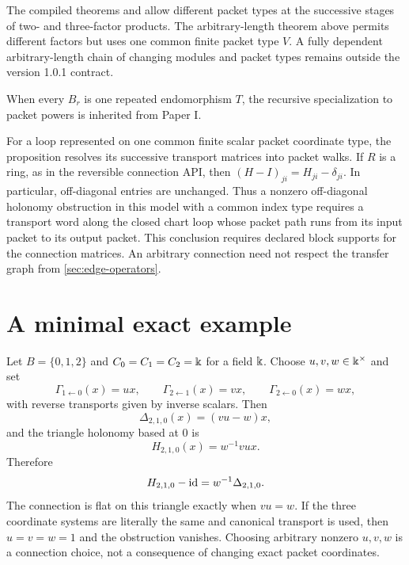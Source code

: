 \begin{boundary}
The compiled theorems
 and
 allow different packet
types at the successive stages of two- and three-factor products.  The
arbitrary-length theorem above permits different factors but uses one common
finite packet type $V$.  A fully dependent arbitrary-length chain of changing
modules and packet types remains outside the version 1.0.1 contract.
\end{boundary}

\begin{remark}
When every $B_r$ is one repeated endomorphism $T$, the recursive
specialization to packet powers is inherited from Paper I.
\end{remark}

For a loop represented on one common finite scalar packet coordinate type,
the proposition resolves its successive transport matrices into packet
walks.  If $R$ is a ring, as in the reversible connection API, then
$(H-I)_{ji}=H_{ji}-\delta_{ji}$.  In particular, off-diagonal entries are
unchanged.  Thus a nonzero off-diagonal holonomy obstruction in this model
with a common index type requires a transport word along the closed chart
loop whose packet path runs from its input packet to its output packet.  This
conclusion requires declared block supports for the connection matrices.
An arbitrary connection need not respect the transfer graph from
\cref{sec:edge-operators}.

\section{A minimal exact example}
\label{sec:example}

\begin{example}
Let $B=\{0,1,2\}$ and $C_0=C_1=C_2=\Bbbk$ for a field $\Bbbk$.  Choose
$u,v,w\in\Bbbk^\times$ and set
\[
\Gamma_{1\leftarrow0}(x)=ux,\qquad
\Gamma_{2\leftarrow1}(x)=vx,\qquad
\Gamma_{2\leftarrow0}(x)=wx,
\]
with reverse transports given by inverse scalars.  Then
\[
\Delta_{2,1,0}(x)=(vu-w)x,
\]
and the triangle holonomy based at $0$ is
\[
H_{2,1,0}(x)=w^{-1}vux.
\]
Therefore
\[
H_{2,1,0}-\operatorname{id}
=w^{-1}\Delta_{2,1,0}.
\]
The connection is flat on this triangle exactly when $vu=w$.  If the three
coordinate systems are literally the same and canonical transport is used,
then $u=v=w=1$ and the obstruction vanishes.  Choosing arbitrary nonzero
$u,v,w$ is a connection choice, not a consequence of changing exact packet
coordinates.
\end{example}

